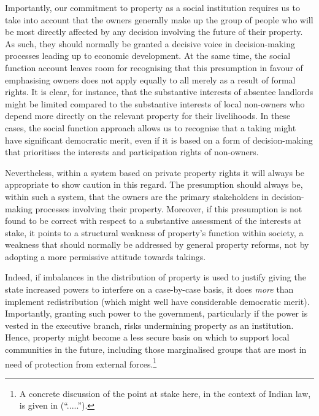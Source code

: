 Importantly, our commitment to property as a social institution requires us to take into account that the owners generally make up the group of people who will be most directly affected by any decision involving the future of their property. As such, they should normally be granted a decisive voice in decision-making processes leading up to economic development. At the same time, the social function account leaves room for recognising that this presumption in favour of emphasising owners does not apply equally to all merely as a result of formal rights. It is clear, for instance, that the substantive interests of absentee landlords might be limited compared to the substantive interests of local non-owners who depend more directly on the relevant property for their livelihoods. In these cases, the social function approach allows us to recognise that a taking might have significant democratic merit, even if it is based on a form of decision-making that prioritises the interests and participation rights of non-owners.

Nevertheless, within a system based on private property rights it will always be appropriate to show caution in this regard. The presumption should always be, within such a system, that the owners are the primary stakeholders in decision-making processes involving their property. Moreover, if this presumption is not found to be correct with respect to a substantive assessment of the interests at stake, it points to a structural weakness of property's function within society, a weakness that should normally be addressed by general property reforms, not by adopting a more permissive attitude towards takings.


Indeed, if imbalances in the distribution of property is used to justify giving the state increased powers to interfere on a case-by-case basis, it does {\it more} than implement redistribution (which might well have considerable democratic merit). Importantly, granting such power to the government, particularly if the power is vested in the executive branch, risks undermining property as an institution. Hence, property might become a less secure basis on which to support local communities in the future, including those marginalised groups that are most in need of protection from external forces.\footnote{A concrete discussion of the point at stake here, in the context of Indian law, is given in \cite{...} (``.....'').}

